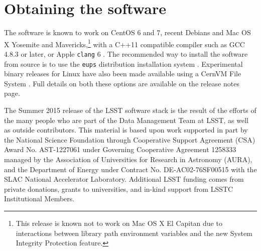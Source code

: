 \documentclass[11pt,twoside]{article}
\begin{document}
\section{Obtaining the software}

The software is known to work on CentOS 6 and 7, recent Debians and
Mac OS X Yosemite and Mavericks,\footnote{This release is known not to
  work on Mac OS X El Capitan due to interactions between library path
  environment variables and the new System Integrity Protection
  feature.}  with a C++11 compatible compiler such as GCC 4.8.3 or later, or
Apple \texttt{clang} 6 . The recommended way to install the software from source is to
use the \texttt{eups} distribution installation system
\citep{EUPS}. Experimental binary releases for Linux have also been
made available using a CernVM File
System \citep[CernVM-FS;][]{2015JPhCS.608a2031M}. Full details on both
these options are available on the release notes page.

\acknowledgements The Summer 2015 release of the LSST software stack
is the result of the efforts of the many people who are part of the
Data Management Team at LSST, as well as outside contributors.  This
material is based upon work supported in part by the National Science
Foundation through Cooperative Support Agreement (CSA) Award
No. AST-1227061 under Governing Cooperative Agreement 1258333 managed
by the Association of Universities for Research in Astronomy (AURA),
and the Department of Energy under Contract No. DE-AC02-76SF00515 with
the SLAC National Accelerator Laboratory.  Additional LSST funding
comes from private donations, grants to universities, and in-kind
support from LSSTC Institutional Members.

\end{document}
